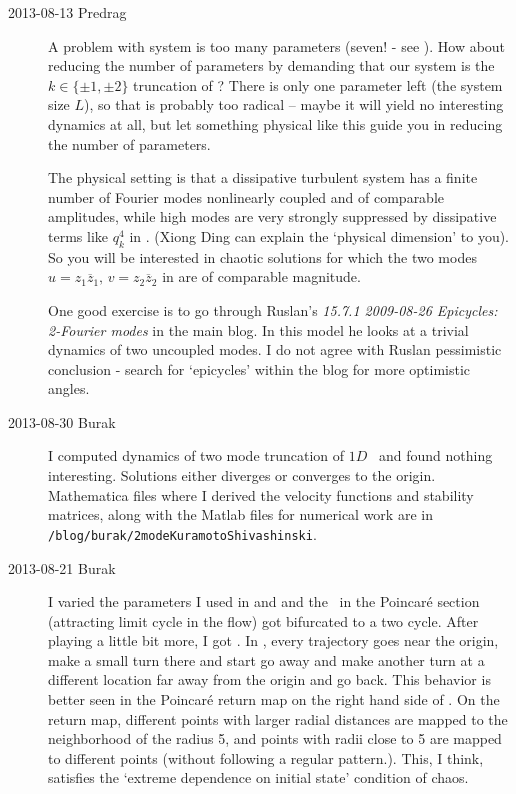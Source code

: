 \begin{description}

\item[2013-08-13 Predrag]
A problem with {\twomode} system is too many parameters (seven! - see
). How about reducing the number of parameters by
demanding that our {\twomode} system is the $k \in \{\pm 1,\pm 2\}$
truncation of \KS? There is only one parameter left (the system size
$L$), so that is probably too radical -- maybe it will
yield no interesting dynamics at all,
but let something physical like this guide you in reducing the number of
parameters.

The physical setting is that a dissipative turbulent system has a finite
number of Fourier modes nonlinearly coupled and of comparable amplitudes,
while high modes are very strongly suppressed by dissipative terms like
$q_k^4$ in . (Xiong Ding can explain the `physical
dimension' to you). So you will be interested in chaotic solutions for
which the two modes $u = {z}_1 \overline{z}_1,\, v = {z}_2
\overline{z}_2$ in  are of comparable magnitude.

One good exercise is to go through Ruslan's {\em 15.7.1 2009-08-26
Epicycles: 2-Fourier modes} in the  {main blog}.
In this model he looks at a trivial dynamics of two uncoupled modes. I do
not agree with Ruslan pessimistic conclusion - search for `epicycles'
within the blog for more optimistic angles.

\item[2013-08-30 Burak]
I computed dynamics of two mode truncation of $1D$ \KSe\ and found
nothing interesting. Solutions either diverges or converges to the
origin. Mathematica files where I derived the velocity functions and
stability matrices, along with the Matlab files for numerical work
are in
\\
\texttt{/blog/burak/2modeKuramotoShivashinski}.


\item[2013-08-21 Burak] I varied the parameters I used in  and  and
the \fixedpnt\ in the Poincar\'e section (attracting limit cycle in the flow) got bifurcated to a two cycle. After playing a little bit more, I got . In , every trajectory goes near the origin, make a small turn there and start go away and make another turn at a different location far away from the origin and go back. This behavior is better seen in the Poincar\'e return map on the right hand side of . On the return map, different points with larger radial distances are mapped to the neighborhood of the radius 5, and points with radii close to 5 are mapped to different points (without following a regular pattern.). This, I think, satisfies the `extreme dependence on initial state' condition of chaos.


\end{description}
